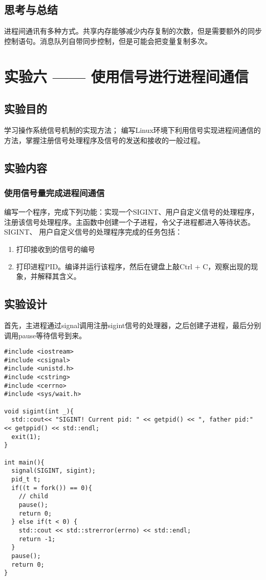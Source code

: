 \documentclass{ctexrep}
\begin{document}
\section{思考与总结}
进程间通讯有多种方式。共享内存能够减少内存复制的次数，但是需要额外的同步控制语句。消息队列自带同步控制，但是可能会把变量复制多次。

\chapter{实验六 —— 使用信号进行进程间通信}
\section{实验目的}
\begin{outline}[cenumerate]
    \1 学习操作系统信号机制的实现方法；
    \1 编写Linux环境下利用信号实现进程间通信的方法，掌握注册信号处理程序及信号的发送和接收的一般过程。
\end{outline}

\section{实验内容}
\subsection{使用信号量完成进程间通信}
编写一个程序，完成下列功能：实现一个SIGINT、用户自定义信号的处理程序，注册该信号处理程序。主函数中创建一个子进程，令父子进程都进入等待状态。SIGINT、 用户自定义信号的处理程序完成的任务包括：
\begin{enumerate}[label = (\arabic*),parsep=0pt,itemsep=0pt,topsep=0pt,partopsep=0pt,labelwidth=1em,leftmargin=*]
    \item 打印接收到的信号的编号
    \item 打印进程PID。编译并运行该程序，然后在键盘上敲Ctrl + C，观察出现的现象，并解释其含义。
\end{enumerate}
\section{实验设计}

首先，主进程通过signal调用注册sigint信号的处理器，之后创建子进程，最后分别调用pause等待信号到来。

\begin{verbatim}
#include <iostream>
#include <csignal>
#include <unistd.h>
#include <cstring>
#include <cerrno>
#include <sys/wait.h>

void sigint(int _){
  std::cout<< "SIGINT! Current pid: " << getpid() << ", father pid:" << getppid() << std::endl;
  exit(1);
}

int main(){
  signal(SIGINT, sigint);
  pid_t t;
  if((t = fork()) == 0){
    // child
    pause();
    return 0;
  } else if(t < 0) {
    std::cout << std::strerror(errno) << std::endl;
    return -1;
  }
  pause();
  return 0;
}
\end{verbatim}
\end{document}
